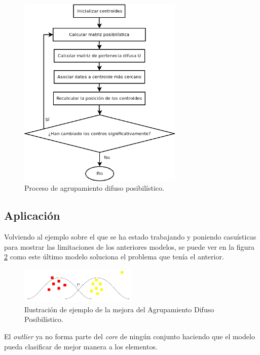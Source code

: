 \documentclass[]{report}
\begin{document}
		\begin{figure}[h!]
			\centering
			\includegraphics[width=0.7\textwidth]{agrupamiento-posibilistico.png}
			\caption{Proceso de agrupamiento difuso posibilístico.}
			\label{agrupamiento_posibilistico}
		\end{figure}
		
		\subsection{Aplicación}
			
			Volviendo al ejemplo sobre el que se ha estado trabajando y poniendo casuísticas para mostrar las limitaciones de los anteriores modelos, se puede ver en la figura \ref{clustering_posibilistico} como este último modelo soluciona el problema que tenía el anterior.
			
			\begin{figure}[h!]
				\centering
				\includegraphics[width=0.5\textwidth]{clustering-posibilistico.jpg}
				\caption{Ilustración de ejemplo de la mejora del Agrupamiento Difuso Posibilístico.}
				\label{clustering_posibilistico}
			\end{figure}
		
			El \textit{outlier} ya no forma parte del \textit{core} de ningún conjunto haciendo que el modelo pueda clasificar de mejor manera a los elementos.\\
			
\end{document}
